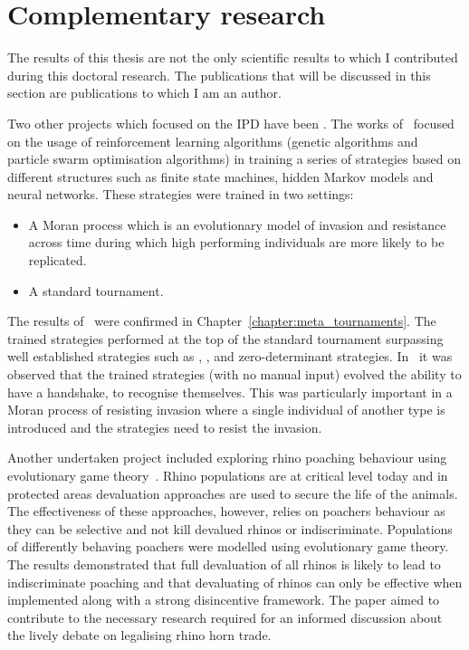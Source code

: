 \section{Complementary research}

The results of this thesis are not the only scientific results to which I
contributed during this doctoral research. The publications that will be
discussed in this section are publications to which I am an author.

Two other projects which focused on the IPD have been
\cite{Knight2017, Harper2017}. The works of~\cite{Knight2017, Harper2017}
focused on the usage of reinforcement learning algorithms (genetic algorithms
and particle swarm optimisation algorithms) in training a series of strategies
based on different structures such as finite state machines, hidden Markov
models and neural networks. These strategies were trained in two settings:

\begin{itemize}
    \item A Moran process which is an evolutionary model of invasion and
    resistance across time during which high performing individuals are more
    likely to be replicated.
    \item A standard tournament.
\end{itemize}

The results of~\cite{Knight2017} were confirmed in
Chapter~\ref{chapter:meta_tournaments}. The trained strategies performed at
the top of the standard tournament surpassing well established
strategies such as \TitForTat, \Pavlov, \Gradual and zero-determinant strategies.
In~\cite{Harper2017} it was observed that the trained strategies (with no manual
input) evolved the ability to have a handshake, to recognise themselves. This
was particularly important in a Moran process of resisting invasion where a
single individual of another type is introduced and the strategies need to
resist the invasion.

Another undertaken project included exploring rhino poaching behaviour using
evolutionary game theory~\cite{Glynatsi2018}. Rhino populations are at critical
level today and in protected areas devaluation approaches are used to secure the
life of the animals. The effectiveness of these approaches, however, relies on
poachers behaviour as they can be selective and not kill devalued rhinos or
indiscriminate. Populations of differently behaving poachers were modelled using
evolutionary game theory. The results
demonstrated that full devaluation of all rhinos is likely to lead to
indiscriminate poaching and that devaluating of rhinos can only be effective
when implemented along with a strong disincentive framework. The paper aimed to
contribute to the necessary research required for an informed discussion about
the lively debate on legalising rhino horn trade.

